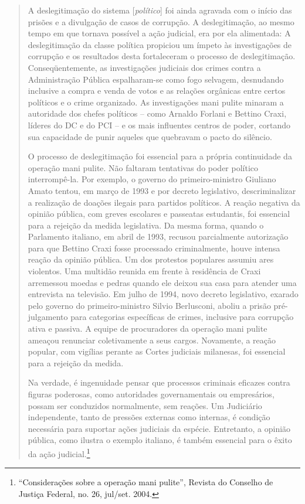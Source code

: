 \begin{quote}
A deslegitimação do sistema {[}\emph{político}{]} foi ainda agravada
com o início das prisões e a divulgação de casos de corrupção. A
deslegitimação, ao mesmo tempo em que tornava possível a ação judicial,
era por ela alimentada: A deslegitimação da classe política propiciou um
ímpeto às investigações de corrupção e os resultados desta fortaleceram
o processo de deslegitimação. Conseqüentemente, as investigações
judiciais dos crimes contra a Administração Pública espalharam-se como
fogo selvagem, desnudando inclusive a compra e venda de votos e as
relações orgânicas entre certos políticos e o crime organizado. As
investigações mani pulite minaram a autoridade dos chefes políticos --
como Arnaldo Forlani e Bettino Craxi, líderes do DC e do PCI -- e os
mais influentes centros de poder, cortando sua capacidade de punir
aqueles que quebravam o pacto do silêncio.

O processo de deslegitimação foi essencial para a própria continuidade
da operação mani pulite. Não faltaram tentativas do poder político
interrompê-la. Por exemplo, o governo do primeiro-ministro Giuliano
Amato tentou, em março de 1993 e por decreto legislativo,
descriminalizar a realização de doações ilegais para partidos políticos.
A reação negativa da opinião pública, com greves escolares e passeatas
estudantis, foi essencial para a rejeição da medida legislativa. Da
mesma forma, quando o Parlamento italiano, em abril de 1993, recusou
parcialmente autorização para que Bettino Craxi fosse processado
criminalmente, houve intensa reação da opinião pública. Um dos protestos
populares assumiu ares violentos. Uma multidão reunida em frente à
residência de Craxi arremessou moedas e pedras quando ele deixou sua
casa para atender uma entrevista na televisão. Em julho de 1994, novo
decreto legislativo, exarado pelo governo do primeiro-ministro Silvio
Berlusconi, aboliu a prisão pré-julgamento para categorias específicas
de crimes, inclusive para corrupção ativa e passiva. A equipe de
procuradores da operação mani pulite ameaçou renunciar coletivamente a
seus cargos. Novamente, a reação popular, com vigílias perante as Cortes
judiciais milanesas, foi essencial para a rejeição da medida.

Na verdade, é ingenuidade pensar que processos criminais eficazes contra
figuras poderosas, como autoridades governamentais ou empresários,
possam ser conduzidos normalmente, sem reações. Um Judiciário
independente, tanto de pressões externas como internas, é condição
necessária para suportar ações judiciais da espécie. Entretanto, a
opinião pública, como ilustra o exemplo italiano, é também essencial
para o êxito da ação judicial.\footnote{``Considerações sobre a
  operação mani pulite'', Revista do Conselho de Justiça Federal, no.
  26, jul/set. 2004.}
\end{quote} 

